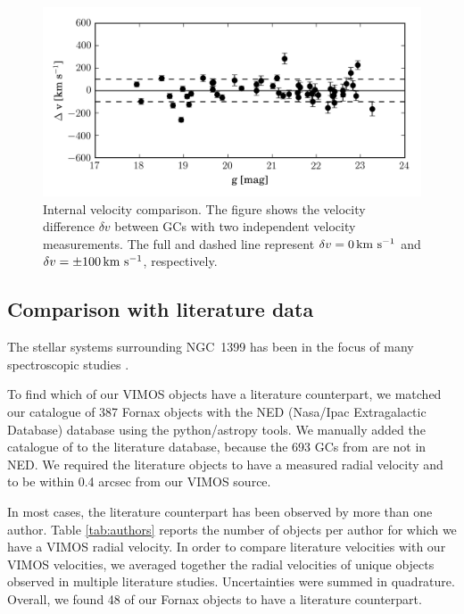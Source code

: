 \documentclass[useAMS,usenatbib]{mn2e}
\newcommand{\kms}{\mbox{\,km~s$^{-1}$}}
\begin{document}
\begin{figure}
\centering
\includegraphics[width=\columnwidth]{figures/internal.png} 
\caption{Internal velocity comparison. The figure shows the velocity difference $\delta v$ between  GCs with two independent velocity measurements. The full and dashed line represent $\delta v = 0 \kms$ and $\delta v = \pm 100 \kms$, respectively. }
\label{fig:internal}
\end{figure}

\subsection{Comparison with literature data}

The stellar systems surrounding NGC~1399 has been in the focus of many spectroscopic studies
\citep{Dirsch04, Schuberth10, Bergond07, Firth07, Chilingarian11, Mieske04, Hilker07, Francis12, Drinkwater00}.

To find which of our VIMOS objects have a literature counterpart, we matched our catalogue of 387 Fornax objects with the NED (Nasa/Ipac Extragalactic Database) database using the python/astropy tools. 
We manually added the catalogue of \citet{Schuberth} to the literature database, because the 693 GCs from \citet{Schuberth} are not in NED. We required the literature objects to have a measured radial velocity and to be within 0.4 arcsec from our VIMOS source. 

In most cases, the literature counterpart has been observed by more than one author. Table \ref{tab:authors} reports the number of objects per author for which we have a VIMOS radial velocity. 
In order to compare literature velocities with our VIMOS velocities, we averaged together the radial velocities of unique objects observed in multiple literature studies. Uncertainties were summed in quadrature. Overall, we found 48 of our Fornax objects to have a literature counterpart. 
\end{document}
